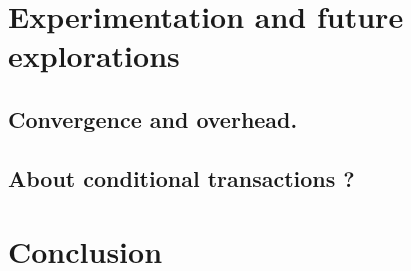 \documentclass[sigplan, 10pt]{acmart}
\begin{document}






\section{Experimentation and future explorations}

\subsection{Convergence and overhead.}
\subsection{About conditional transactions ?}

\section{Conclusion}
\end{document}

